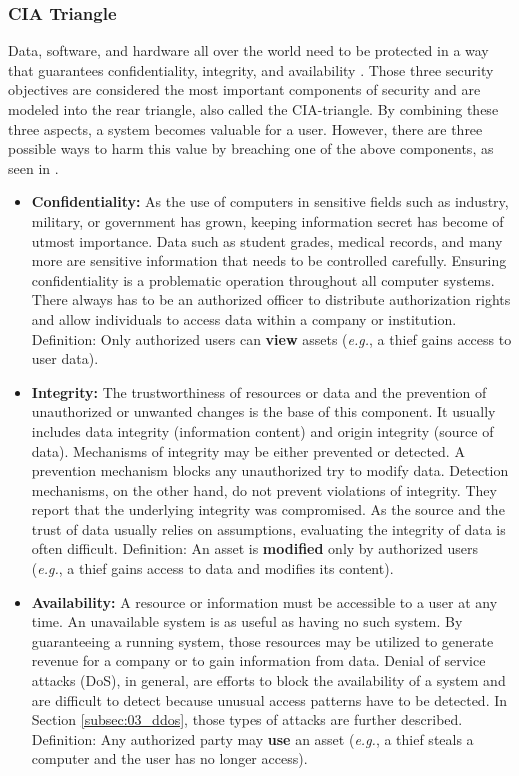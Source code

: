 \subsubsection{CIA Triangle}
Data, software, and hardware all over the world need to be protected in a way that guarantees confidentiality, integrity, and availability \cite{Pfleeger2014}. Those three security objectives are considered the most important components of security and are modeled into the rear triangle, also called the CIA-triangle. By combining these three aspects, a system becomes valuable for a user. However, there are three possible ways to harm this value by breaching one of the above components, as seen in \cite{Bishop2004}.
\begin{itemize}
  \item \textbf{Confidentiality:} As the use of computers in sensitive fields such as industry, military, or government has grown, keeping information secret has become of utmost importance. Data such as student grades, medical records, and many more are sensitive information that needs to be controlled carefully. Ensuring confidentiality is a problematic operation throughout all computer systems. There always has to be an authorized officer to distribute authorization rights and allow individuals to access data within a company or institution.
        \subitem Definition: Only authorized users can \textbf{view} assets (\textit{e.g.}, a thief gains access to user data).
  \item \textbf{Integrity:} The trustworthiness of resources or data and the prevention of unauthorized or unwanted changes is the base of this component. It usually includes data integrity (information content) and origin integrity (source of data). Mechanisms of integrity may be either prevented or detected. A prevention mechanism blocks any unauthorized try to modify data. Detection mechanisms, on the other hand, do not prevent violations of integrity. They report that the underlying integrity was compromised. As the source and the trust of data usually relies on assumptions, evaluating the integrity of data is often difficult.
        \subitem Definition: An asset is \textbf{modified} only by authorized users (\textit{e.g.}, a thief gains access to data and modifies its content).
  \item \textbf{Availability:} A resource or information must be accessible to a user at any time. An unavailable system is as useful as having no such system. By guaranteeing a running system, those resources may be utilized to generate revenue for a company or to gain information from data. Denial of service attacks (DoS), in general, are efforts to block the availability of a system and are difficult to detect because unusual access patterns have to be detected. In Section \ref{subsec:03_ddos}, those types of attacks are further described.
        \subitem Definition: Any authorized party may \textbf{use} an asset (\textit{e.g.}, a thief steals a computer and the user has no longer access).
\end{itemize}


